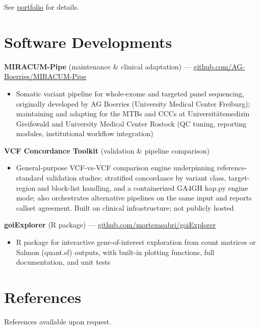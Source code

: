 \documentclass[10pt, a4paper]{article}
\begin{document}
See \href{https://mortezasabri.github.io/#pipelines}{portfolio} for details.

\section{Software Developments}

\noindent\textbf{MIRACUM-Pipe} (maintenance \& clinical adaptation) ---
\href{https://github.com/AG-Boerries/MIRACUM-Pipe}{github.com/AG-Boerries/MIRACUM-Pipe}
\begin{itemize}
  \item Somatic variant pipeline for whole-exome and targeted panel sequencing, originally developed by
        AG Boerries (University Medical Center Freiburg); maintaining and adapting for the MTBs and CCCs
        at Universit\"atsmedizin Greifswald and University Medical Center Rostock (QC tuning, reporting
        modules, institutional workflow integration)
\end{itemize}

\vspace{1pt}

\noindent\textbf{VCF Concordance Toolkit} (validation \& pipeline comparison)
\begin{itemize}
  \item General-purpose VCF-vs-VCF comparison engine underpinning reference-standard validation studies:
        stratified concordance by variant class, target-region and block-list handling, and a containerized
        GA4GH hap.py engine mode; also orchestrates alternative pipelines on the same input and reports
        callset agreement. Built on clinical infrastructure; not publicly hosted
\end{itemize}

\vspace{1pt}

\noindent\textbf{goiExplorer} (R package) ---
\href{https://github.com/mortezasabri/goiExplorer}{github.com/mortezasabri/goiExplorer}
\begin{itemize}
  \item R package for interactive gene-of-interest exploration from count matrices or Salmon
        (quant.sf) outputs, with built-in plotting functions, full documentation, and unit tests
\end{itemize}

\section{References}

\noindent References available upon request.
\end{document}
